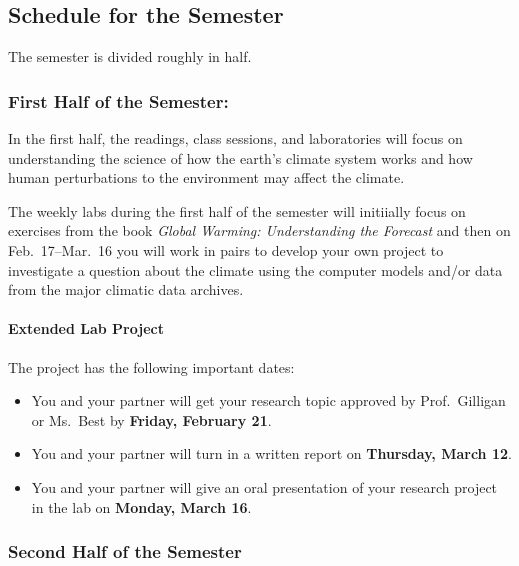 \documentclass[
]{article}
\providecommand{\tightlist}{%
  \setlength{\itemsep}{0pt}\setlength{\parskip}{0pt}}
\begin{document}
\hypertarget{schedule-for-the-semester}{%
\subsection{Schedule for the Semester}\label{schedule-for-the-semester}}

The semester is divided roughly in half.

\hypertarget{first-half-of-the-semester}{%
\subsubsection{First Half of the
Semester:}\label{first-half-of-the-semester}}

In the first half, the readings, class sessions, and laboratories will
focus on understanding the science of how the earth's climate system
works and how human perturbations to the environment may affect the
climate.

The weekly labs during the first half of the semester will initiially
focus on exercises from the book \emph{Global Warming: Understanding the
Forecast} and then on Feb.~17--Mar.~16 you will work in pairs to develop
your own project to investigate a question about the climate using the
computer models and/or data from the major climatic data archives.

\hypertarget{extended-lab-project}{%
\paragraph{Extended Lab Project}\label{extended-lab-project}}

The project has the following important dates:

\begin{itemize}
\tightlist
\item
  You and your partner will get your research topic approved by
  Prof.~Gilligan or Ms.~Best by \textbf{Friday, February 21}.
\item
  You and your partner will turn in a written report on
  \textbf{Thursday, March 12}.
\item
  You and your partner will give an oral presentation of your research
  project in the lab on \textbf{Monday, March 16}.
\end{itemize}

\hypertarget{second-half-of-the-semester}{%
\subsubsection{Second Half of the
Semester}\label{second-half-of-the-semester}}
\end{document}
